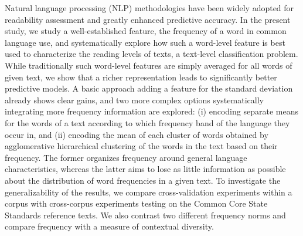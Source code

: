 Natural language processing (NLP) methodologies have been widely adopted for readability assessment and greatly enhanced predictive accuracy. In the present study, we study a well-established feature, the frequency of a word in common language use, and systematically explore how such a word-level feature is best used to characterize the reading levels of texts, a text-level classification problem. While traditionally such word-level features are simply averaged for all words of given text, we show that a richer representation leads to significantly better predictive models. A basic approach adding a feature for the standard deviation already shows clear gains, and two more complex options systematically integrating more frequency information are explored: (i) encoding separate means for the words of a text according to which frequency band of the language they occur in, and (ii) encoding the mean of each cluster of words obtained by agglomerative hierarchical clustering of the words in the text based on their frequency. The former organizes frequency around general language characteristics, whereas the latter aims to lose as little information as possible about the distribution of word frequencies in a given text. To investigate the generalizability of the results, we compare cross-validation experiments within a corpus with cross-corpus experiments testing on the Common Core State Standards reference texts. We also contrast two different frequency norms and compare frequency with a measure of contextual diversity.
